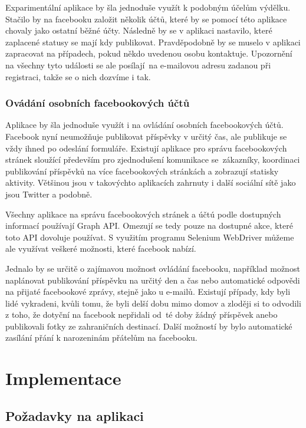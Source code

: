 \documentclass[thesis=M,czech]{FITthesis}[2013/05/10]
\begin{document}
Exparimentální aplikace by šla jednoduše využít k podobným účelům výdělku. Stačilo by na facebooku založit několik účtů, které by se pomocí této aplikace chovaly jako ostatní běžné účty. Následně by se v aplikaci nastavilo, které zaplacené statusy se mají kdy publikovat. Pravděpodobně by se muselo v aplikaci zapracovat na případech, pokud někdo uvedenou osobu kontaktuje. Upozornění na všechny tyto události se ale posílají~na e-mailovou adresu zadanou při registraci, takže se o nich dozvíme i tak.

\subsection{Ovádání osobních facebookových účtů}

Aplikace by šla jednoduše využít i na ovládání osobních facebookových účtů. Facebook nyní neumožňuje publikovat příspěvky v určitý čas, ale publikuje se vždy ihned po odeslání formuláře. Existují aplikace pro správu facebookových stránek sloužící především pro zjednodušení komunikace se~zákazníky, koordinaci publikování příspěvků na více facebookových stránkách a zobrazují statisky aktivity. Většinou jsou v takovýchto aplikacích zahrnuty i další sociální sítě jako jsou Twitter a podobně.

Všechny aplikace na správu facebookových stránek a účtú podle dostupných informací používají Graph API. Omezují se tedy pouze na dostupné akce, které toto API dovoluje používat. S využitím programu Selenium WebDriver můžeme ale využívat veškeré možnosti, které facebook nabízí.

Jednalo by se určitě o zajímavou možnost ovládání facebooku, například možnost naplánovat publikování příspěvku na určitý den a čas nebo automatické odpovědi na přijaté facebookové zprávy, stejně jako u e-mailů. Existují případy, kdy byli lidé vykradeni, kvůli tomu, že byli delší dobu mimo domov a zloději si to odvodili z toho, že dotyční na facebook nepřidali od~té doby žádný příspěvek anebo publikovali fotky ze zahraničních destinací. Další možností by bylo automatické zasílání přání k narozeninám přátelům na facebooku.



\chapter{Implementace}

\section{Požadavky na aplikaci}
\end{document}

